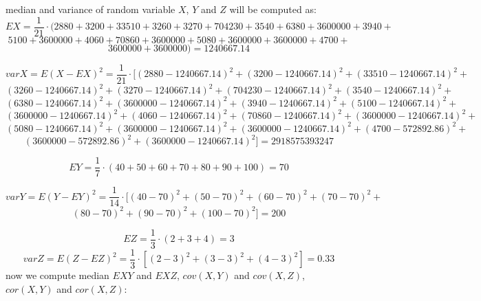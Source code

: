 \documentclass[11pt,twoside,a4paper]{book}
\begin{document}





median and variance of random variable $X$, $Y$ and $Z$ will be computed as:
$$EX = \frac{1}{21}\cdot(2 880 + 3 200 +33 510  + 3 260 + 3 270 
 + 704 230 + 3
540+6 380 +3600000 + 3 940 +$$
$$ 5 100+3600000 + 4 060 + 70 860+3600000 + 5 080 + 3600 000+3600000+ 4
700 +$$
$$ 3600 000+3600000)=1240667.14$$

$$varX=E(X-EX)^2=\frac{1}{21}\cdot[\left(2 880-1240667.14
\right)^2+\left(3200-1240667.14\right)^2+\left(33510 -1240667.14\right)^2+$$
$$\left(3260-1240667.14\right)^2+\left(3270-1240667.14\right)^2+\left(704230-1240667.14\right)^2+\left(3540-1240667.14\right)^2+$$
$$\left(6380-1240667.14\right)^2+\left(3600000-1240667.14\right)^2+\left(3940-1240667.14\right)^2+\left(5100-1240667.14\right)^2+$$
$$\left( 3600000
-1240667.14\right)^2+\left(4060-1240667.14\right)^2+\left(70860-1240667.14\right)^2+\left(3600000-1240667.14\right)^2+$$
$$\left(5080-1240667.14\right)^2+\left(3600000-1240667.14\right)^2+\left(3600000-1240667.14\right)^2+\left(4700-572892.86\right)^2+$$
$$\left(3600000-572892.86\right)^2+\left(3600000-1240667.14\right)^2]=2918575393247$$

$$EY = \frac{1}{7}\cdot \left(40 +  50 +  60 +
 70 +  80 +  90 +
100\right)=70$$

$$varY=E(Y-EY)^2=\frac{1}{14}\cdot[\left(40 -70\right)^2+\left(50
-70\right)^2+\left(60 -70\right)^2+\left(70 -70\right)^2+$$
$$\left(80 -70\right)^2+\left(90 -70\right)^2+\left(100 -70\right)^2]=200$$

$$EZ = \frac{1}{3}\cdot \left(2 +  3 + 4\right)=3$$
$$varZ=E(Z-EZ)^2=\frac{1}{3}\cdot [\left(2 -  3\right)^2+\left(3 - 
3\right)^2+\left(4 -  3\right)^2]=0.33$$ 
now we compute median $EXY$ and $EXZ$, $cov(X,Y)$ and $cov(X,Z)$, $cor(X,Y)$
and $cor(X,Z)$:
\end{document}
